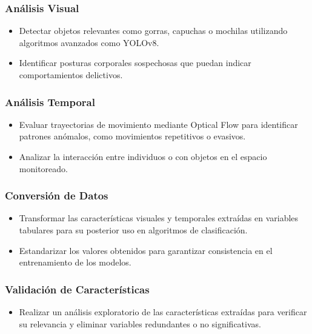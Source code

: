 \subsubsection{Análisis Visual}

\begin{itemize}
    \item Detectar objetos relevantes como gorras, capuchas o mochilas utilizando algoritmos avanzados como YOLOv8.
    \item Identificar posturas corporales sospechosas que puedan indicar comportamientos delictivos.
\end{itemize}


\subsubsection{Análisis Temporal}
\begin{itemize}
    \item Evaluar trayectorias de movimiento mediante Optical Flow para identificar patrones anómalos, como movimientos repetitivos o evasivos.
    \item Analizar la interacción entre individuos o con objetos en el espacio monitoreado.
\end{itemize}


\subsubsection{Conversión de Datos}
\begin{itemize}
    \item Transformar las características visuales y temporales extraídas en variables tabulares para su posterior uso en algoritmos de clasificación.
    \item Estandarizar los valores obtenidos para garantizar consistencia en el entrenamiento de los modelos.
\end{itemize}



\subsubsection{Validación de Características}
\begin{itemize}
    \item Realizar un análisis exploratorio de las características extraídas para verificar su relevancia y eliminar variables redundantes o no significativas.
\end{itemize}


